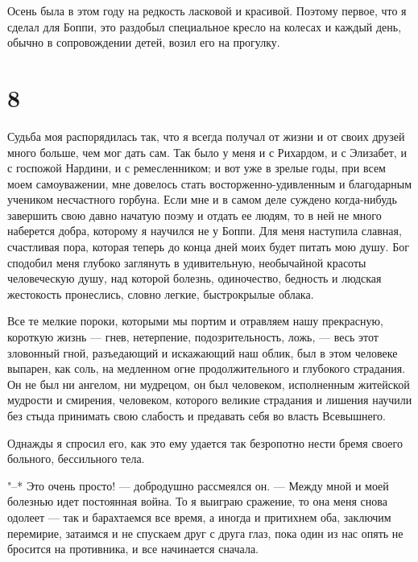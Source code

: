 Осень  была в  этом  году  на редкость  ласковой  и красивой.  Поэтому
первое, что  я сделал  для Боппи, это  раздобыл специальное  кресло на
колесах  и каждый  день, обычно  в сопровождении  детей, возил  его на
прогулку.


\section*{8}


Судьба моя распорядилась так, что я всегда получал от жизни и от своих
друзей много больше, чем мог дать сам. Так было у меня и с Рихардом, и
с  Элизабет, и  с  госпожой  Нардини, и  с  ремесленником;  и вот  уже
в  зрелые  годы,  при  всем  моем  самоуважении,  мне  довелось  стать
восторженно-удивленным  и  благодарным учеником  несчастного  горбуна.
Если  мне и  в самом  деле суждено  когда-нибудь завершить  свою давно
начатую поэму  и отдать ее людям,  то в ней не  много наберется добра,
которому я научился не у Боппи. Для меня наступила славная, счастливая
пора, которая  теперь до конца  дней моих  будет питать мою  душу. Бог
сподобил меня  глубоко заглянуть  в удивительную,  необычайной красоты
человеческую  душу,  над  которой  болезнь,  одиночество,  бедность  и
людская жестокость пронеслись, словно легкие, быстрокрылые облака.

Все те мелкие пороки, которыми  мы портим и отравляем нашу прекрасную,
короткую жизнь --- гнев,  нетерпение, подозрительность, ложь, --- весь
этот зловонный  гной, разъедающий и  искажающий наш облик, был  в этом
человеке  выпарен,  как соль,  на  медленном  огне продолжительного  и
глубокого  страдания.  Он не  был  ни  ангелом,  ни мудрецом,  он  был
человеком,  исполненным  житейской  мудрости  и  смирения,  человеком,
которого великие страдания и лишения  научили без стыда принимать свою
слабость и предавать себя во власть Всевышнего.

Однажды я спросил его, как это  ему удается так безропотно нести бремя
своего больного, бессильного тела.

"--* Это очень просто! --- добродушно  рассмеялся он. --- Между мной и
моей болезнью  идет постоянная  война. То я  выиграю сражение,  то она
меня  снова одолеет  ---  так  и барахтаемся  все  время,  а иногда  и
притихнем оба, заключим перемирие, затаимся и не спускаем друг с друга
глаз,  пока  один из  нас  опять  не  бросится  на противника,  и  все
начинается сначала.

